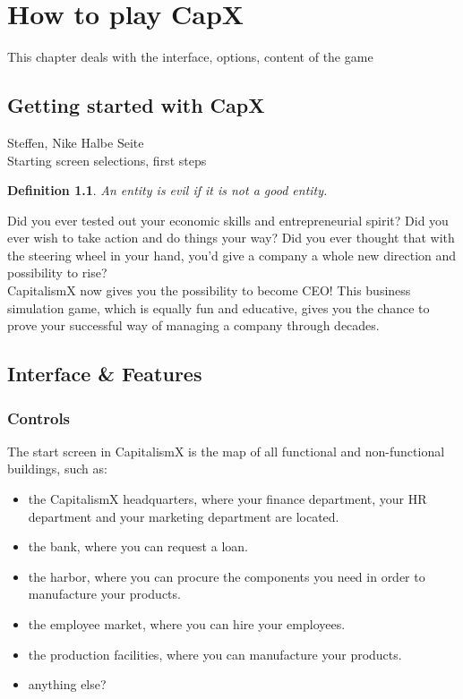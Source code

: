 \documentclass[11pt,titlepage,oneside,openany]{book}
\newtheorem{definition}{Definition}
\begin{document}
\chapter{How to play CapX}
\label{cha:theory}
 This chapter deals with the interface, options, content of the game

\section{Getting started with CapX}
Steffen, Nike
Halbe Seite\\

\label{sec:prelim}
Starting screen selections, first steps
\begin{definition}
\label{def:evil}
An entity is evil if it is not a good entity.
\end{definition}

Did you ever tested out your economic skills and entrepreneurial spirit? Did you ever wish to take action and do things your way? Did you ever thought that with the steering wheel in your hand, you'd give a company a whole new direction and possibility to rise? \\
CapitalismX now gives you the possibility to become CEO! This business simulation game, which is equally fun and educative, gives you the chance to prove your successful way of managing a company through decades.\\


\section{Interface \& Features}
\label{sec:good}

\subsection{Controls}  
The start screen in CapitalismX is the map of all functional and non-functional buildings, such as:
\begin{itemize}
    \item the CapitalismX headquarters, where your finance department, your HR department and your marketing department are located. 
    \item the bank, where you can request a loan.
    \item the harbor, where you can procure the components you need in order to manufacture your products.
    \item the employee market, where you can hire your employees.
    \item the production facilities, where you can manufacture your products.
    \item anything else?
\end{itemize}
\end{document}
